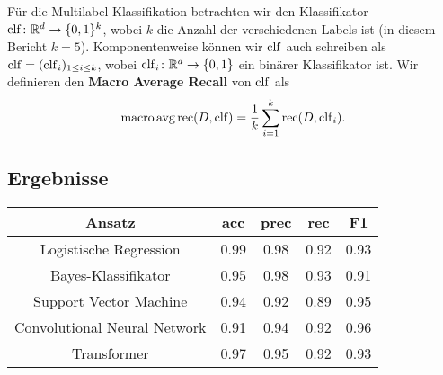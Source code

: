 Für die Multilabel-Klassifikation betrachten wir den Klassifikator $\operatorname{clf}\colon\mathbb{R}^d\to\{0, 1\}^k$, wobei $k$ die Anzahl der verschiedenen Labels ist (in diesem Bericht $k=5$). Komponentenweise können wir $\operatorname{clf}$ auch schreiben als $\operatorname{clf} = (\operatorname{clf}_i)_{1\leq i\leq k}$, wobei $\operatorname{clf}_i\colon\mathbb{R}^d\to\{0, 1\}$ ein binärer Klassifikator ist. Wir definieren den \textbf{Macro Average Recall} von $\operatorname{clf}$ als
\begin{equation*}
    \operatorname{macro\,avg\,rec}(D, \operatorname{clf}) = \frac{1}{k}\sum_{i=1}^k\operatorname{rec} (D, \operatorname{clf}_i).
\end{equation*}

\subsection{Ergebnisse}
\begin{center}
    \begin{tabular}{|c|c|c|c|c|}
        \hline
        Ansatz                       & acc  & prec & rec  & F1   \\
        \hline
        Logistische Regression       & 0.99 & 0.98 & 0.92 & 0.93 \\
        Bayes-Klassifikator          & 0.95 & 0.98 & 0.93 & 0.91 \\
        Support Vector Machine       & 0.94 & 0.92 & 0.89 & 0.95 \\
        Convolutional Neural Network & 0.91 & 0.94 & 0.92 & 0.96 \\
        Transformer                  & 0.97 & 0.95 & 0.92 & 0.93 \\
        \hline
    \end{tabular}
\end{center}